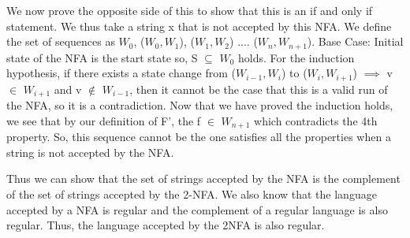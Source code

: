 \documentclass{article}
\begin{document}
\begin{enumerate}
We now prove the opposite side of this to show that this is an if and only if statement. We thus take a string x that is not accepted by this NFA. We define the set of sequences as $W_{0}$, ($W_0, W_1$), ($W_1, W_2$) .... ($W_n, W_{n+1}$). Base Case: Initial state of the NFA is the start state so, S $\subseteq$ $W_0$ holds. For the induction hypothesis, if there exists a state change from ($W_{i-1}, W_{i}$) to ($W_{i}, W_{i+1}$)  $\implies$ v $\in$ $W_{i+1}$ and v $\notin$ $W_{i-1}$, then it cannot be the case that this is a valid run of the NFA, so it is a contradiction. Now that we have proved the induction holds, we see that by our definition of F', the f $\in$ $W_{n+1}$ which contradicts the 4th property. So, this sequence cannot be the one satisfies all the properties when a string is not accepted by the NFA.

Thus we can show that the set of strings accepted by the NFA is the complement of the set of strings accepted by the 2-NFA. We also know that the language accepted by a NFA is regular and the complement of a regular language is also regular. Thus, the language accepted by the 2NFA is also regular.


\end{enumerate}
\pagebreak
\end{document}
